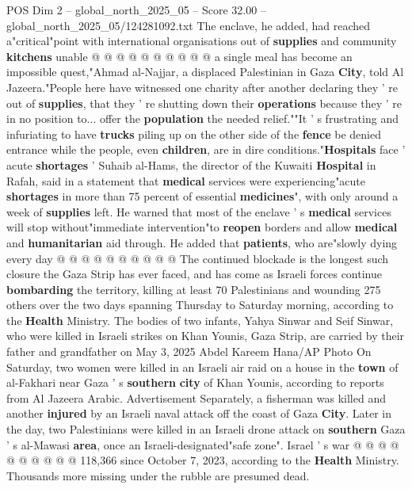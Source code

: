 \begin{textsample}{POS Dim 2 – global\_north\_2025\_05 – Score 32.00 – global\_north\_2025\_05/124281092.txt}
The enclave, he added, had reached a"critical"point with international organisations out of \textbf{supplies} and community \textbf{kitchens} unable @ @ @ @ @ @ @ @ @ @ a single meal has become an impossible quest,"Ahmad al-Najjar, a displaced Palestinian in Gaza \textbf{City}, told Al Jazeera."People here have witnessed one charity after another declaring they ' re out of \textbf{supplies}, that they ' re shutting down their \textbf{operations} because they ' re in no position to... offer the \textbf{population} the needed relief.""It ' s frustrating and infuriating to have \textbf{trucks} piling up on the other side of the \textbf{fence} be denied entrance while the people, even \textbf{children}, are in dire conditions."\textbf{Hospitals} face ' acute \textbf{shortages} ' Suhaib al-Hams, the director of the Kuwaiti \textbf{Hospital} in Rafah, said in a statement that \textbf{medical} services were experiencing"acute \textbf{shortages} in more than 75 percent of essential \textbf{medicines}", with only around a week of \textbf{supplies} left.
He warned that most of the enclave ' s \textbf{medical} services will stop without"immediate intervention"to \textbf{reopen} borders and allow \textbf{medical} and \textbf{humanitarian} aid through.
He added that \textbf{patients}, who are"slowly dying every day @ @ @ @ @ @ @ @ @ @ The continued blockade is the longest such closure the Gaza Strip has ever faced, and has come as Israeli forces continue \textbf{bombarding} the territory, killing at least 70 Palestinians and wounding 275 others over the two days spanning Thursday to Saturday morning, according to the \textbf{Health} Ministry.
The bodies of two infants, Yahya Sinwar and Seif Sinwar, who were killed in Israeli strikes on Khan Younis, Gaza Strip, are carried by their father and grandfather on May 3, 2025 Abdel Kareem Hana/AP Photo On Saturday, two women were killed in an Israeli air raid on a house in the \textbf{town} of al-Fakhari near Gaza ' s \textbf{southern} \textbf{city} of Khan Younis, according to reports from Al Jazeera Arabic.
Advertisement Separately, a fisherman was killed and another \textbf{injured} by an Israeli naval attack off the coast of Gaza \textbf{City}.
Later in the day, two Palestinians were killed in an Israeli drone attack on \textbf{southern} Gaza ' s al-Mawasi \textbf{area}, once an Israeli-designated"safe zone".
Israel ' s war @ @ @ @ @ @ @ @ @ @ 118,366 since October 7, 2023, according to the \textbf{Health} Ministry.
Thousands more missing under the rubble are presumed dead.

\end{textsample}
